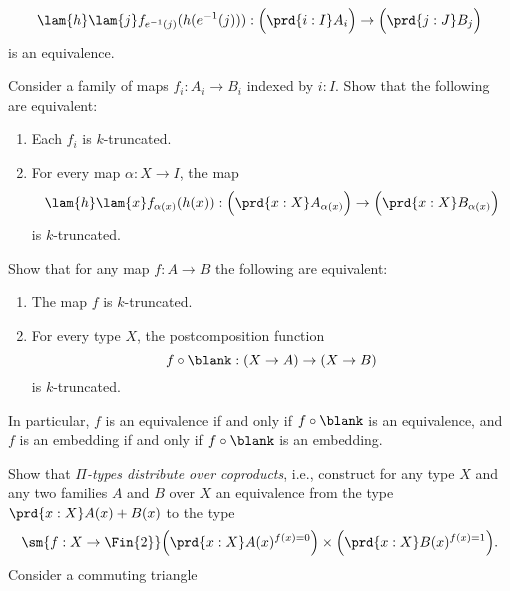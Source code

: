 \begin{exercises}
\begin{subexenum}
\begin{equation*}
      \lam{h}\lam{j} f_{e^{-1}(j)}(h(e^{-1}(j))) : \Big(\prd{i:I}A_i\Big)\to\Big(\prd{j:J}B_j\Big)
    \end{equation*}
    is an equivalence.
  \item Consider a family of maps $f_i:A_i\to B_i$ indexed by $i:I$. Show that the following are equivalent:
    \begin{enumerate}
    \item Each $f_i$ is $k$-truncated.
    \item For every map $\alpha:X\to I$, the map
      \begin{equation*}
        \lam{h}\lam{x}f_{\alpha(x)}(h(x)):\Big(\prd{x:X}A_{\alpha(x)}\Big)\to\Big(\prd{x:X}B_{\alpha(x)}\Big)
      \end{equation*}
      is $k$-truncated.
    \end{enumerate}
  \item \label{ex:equiv-postcomp}Show that for any map $f:A\to B$ the following are equivalent:
    \begin{enumerate}
    \item The map $f$ is $k$-truncated.
    \item For every type $X$, the postcomposition function
      \begin{equation*}
        f\circ\blank : (X\to A)\to (X\to B)
      \end{equation*}
      is $k$-truncated.
    \end{enumerate}
    In particular, $f$ is an equivalence if and only if $f\circ\blank$ is an equivalence, and $f$ is an embedding if and only if $f\circ\blank$ is an embedding.
  \end{subexenum}
  \exitem Show that \emph{$\Pi$-types distribute over coproducts}, i.e., construct for any type $X$ and any two families $A$ and $B$ over $X$ an equivalence from the type $\prd{x:X}A(x)+B(x)$ to the type
  \begin{equation*}
    \sm{f:X\to\Fin{2}}\Big(\prd{x:X}A(x)^{f(x)=0}\Big)\times\Big(\prd{x:X}B(x)^{f(x)=1}\Big).
  \end{equation*}
  \exitem \label{ex:sec_retr}Consider a commuting triangle 
  \begin{equation*}
    \begin{tikzcd}[column sep=tiny]

\end{tikzcd}
\end{equation*}
\end{exercises}
